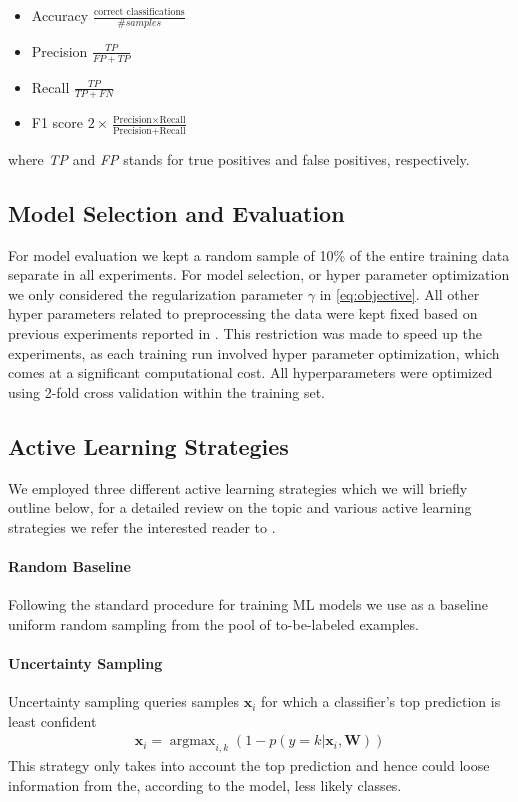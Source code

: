 \documentclass[runningheads,a4paper]{article}
\renewcommand{\vec}[1]{\mathbf{#1}}
\DeclareMathOperator*{\argmax}{argmax}
\begin{document}
\begin{itemize}
\item Accuracy $\frac{\text{correct classifications}}{\# samples}$
\item Precision $\frac{TP} {FP + TP}$
\item Recall $\frac{TP}{TP + FN}$
\item F1 score $2\times \frac{\text{Precision} \times \text{Recall}}{\text{Precision} + \text{Recall}}$
\end{itemize}

where \textit{TP} and \textit{FP} stands for true positives and false positives, respectively.


\subsection{Model Selection and Evaluation}\label{sec:crossvalidation}
For model evaluation we kept a random sample of 10\% of the entire training data separate in all experiments. For model selection, or hyper parameter optimization we only considered the regularization parameter $\gamma$ in \autoref{eq:objective}. All other hyper parameters related to preprocessing the data were kept fixed based on previous experiments reported in \cite{Biessmann16}. This restriction was made to speed up the experiments, as each training run involved hyper parameter optimization, which comes at a significant computational cost. All hyperparameters were optimized using 2-fold cross validation within the training set. 

\subsection{Active Learning Strategies}\label{sec:active_learning_strategies}
We employed three different active learning strategies which we will briefly outline below, for a detailed review on the topic and various active learning strategies we refer the interested reader to \cite{2012Settles}. 

\paragraph{Random Baseline} Following the standard procedure for training ML models we use as a baseline uniform random sampling from the pool of to-be-labeled examples. 

\paragraph{Uncertainty Sampling}
Uncertainty sampling queries samples $\vec{x}_i$ for which a classifier's top prediction is least confident
\begin{align}\label{eq:uncertainty_sampling}
\vec{x}_i = \argmax_{i,k} \left(1- p(y=k|\vec{x}_i,\vec{W})\right)
\end{align}
This strategy only takes into account the top prediction and hence could loose information from the, according to the model, less likely classes. 
\end{document}
